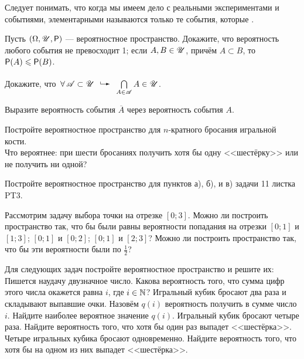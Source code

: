 \documentclass[a4paper,12pt]{article}
\begin{document}
  Следует понимать, что когда мы имеем дело с реальными экспериментами и событиями, элементарными называются только те события, которые .

\vspace{-0.15cm}

  Пусть $(\Omega,\mathscr{U},\mathsf{P})$ --- вероятностное пространство. Докажите, что  вероятность любого события не превосходит 1;  если $A,B\in\mathscr{U}$, причём $A\subset B$, то $\mathsf{P}(A)\leqslant\mathsf{P}(B)$.

\vspace{-0.2cm}

  Докажите, что $\fa\As\subset\Us\exec\bigcap\limits_{A\in\As}A\in\Us$.

\vspace{-0.2cm}

  Выразите вероятность события $\overline{A}$ через вероятность события $A$.

\vspace{-0.2cm}

   Постройте вероятностное пространство для $n$-кратного бросания игральной кости.\\
   Что вероятнее: при шести бросаниях получить хотя бы одну <<шестёрку>> или не получить ни одной?

\vspace{-0.2cm}

   Постройте вероятностное пространство для пунктов а), б), и в) задачи 11 листка PT3.

  Рассмотрим задачу выбора точки на отрезке $[0;3]$. Можно ли построить пространство так, что бы были равны вероятности попадания на отрезки  $[0;1]$ и $[1;3]$;  $[0;1]$ и $[0;2]$;  $[0;1]$ и $[2;3]$?  Можно ли построить пространство так, что бы эти вероятности были по $\frac{1}{2}$?

  Для следующих задач постройте вероятностное пространство и решите их:
   Пишется наудачу двузначное число. Какова вероятность того, что сумма цифр этого числа окажется равна $i$, где $i\in\mathbb{N}$?
   Игральный кубик бросают два раза и складывают выпавшие очки. Назовём $q(i)$ вероятность получить в сумме число $i$. Найдите наиболее вероятное значение $q(i)$.
   Игральный кубик бросают четыре раза. Найдите вероятность того, что хотя бы один раз выпадет <<шестёрка>>.
   Четыре игральных кубика бросают одновременно. Найдите вероятность того, что хотя бы на одном из них выпадет <<шестёрка>>.
\end{document}
